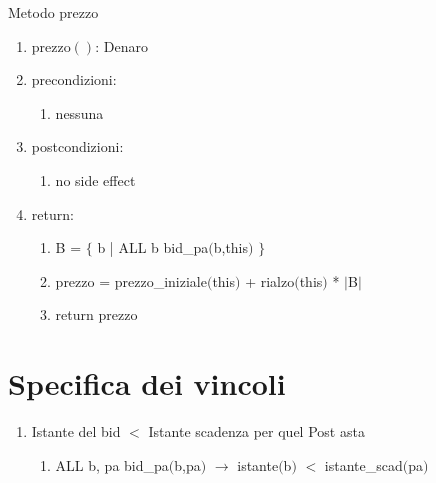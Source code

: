 \documentclass{article}
\begin{document}
Metodo prezzo
\begin{enumerate}
    \item\label{sec:MetodiPostAstaPrezzo}prezzo$()$: Denaro
    \item precondizioni:
    \begin{enumerate}
        \item nessuna
    \end{enumerate}
    \item postcondizioni:
    \begin{enumerate}
        \item no side effect
    \end{enumerate}
    \item return:
    \begin{enumerate}
        \item B = $\{$ b | ALL b bid\_pa$($b,this$)$ $\}$
        \item prezzo = prezzo\_iniziale$($this$)$ + rialzo$($this$)$ * $|$B$|$
        \item return prezzo
    \end{enumerate}
\end{enumerate}

\section{\label{sec:SpecificaVincoli}Specifica dei vincoli}

\begin{enumerate}
    \item Istante del bid $<$ Istante scadenza per quel Post asta
    \begin{enumerate}
        \item ALL b, pa bid\_pa$($b,pa$)$ $\rightarrow$ istante$($b$)$ $<$ istante\_scad$($pa$)$
    \end{enumerate}
\end{enumerate}
\end{document}
